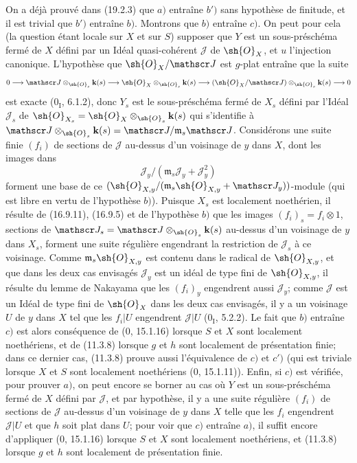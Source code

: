 On a déjà prouvé dans (19.2.3) que $a)$ entraîne $b')$ sans hypothèse de finitude, et il est trivial que $b')$ entraîne $b)$. Montrons que $b)$ entraîne $c)$. On peut pour cela (la question étant locale sur $X$ et sur $S$) supposer que $Y$ est un sous-préschéma fermé de $X$ défini par un Idéal quasi-cohérent $\mathscr J$ de $\sh{O}_X$, et $u$ l'injection canonique. L'hypothèse que $\sh{O}_X/\mathscr J$ est $g$-plat entraîne que la suite
\[
  0\longrightarrow\mathscr J\otimes_{\sh{O}_s}\mathbf k(s)\longrightarrow\sh{O}_X\otimes_{\sh{O}_s}\mathbf k(s)\longrightarrow(\sh{O}_X/\mathscr J)\otimes_{\sh{O}_s}\mathbf k(s)\longrightarrow0
\]
est exacte ($0_{\mathrm I}$, 6.1.2), donc $Y_s$ est le sous-préschéma fermé de $X_s$ défini par l'Idéal $\mathscr J_s$ de $\sh{O}_{X_s}=\sh{O}_X\otimes_{\sh{O}_s}\mathbf k(s)$ qui s'identifie à $\mathscr J\otimes_{\sh{O}_s}\mathbf k(s)=\mathscr J/\mathfrak m_s\mathscr J$. Considérons une suite finie $(f_i)$ de sections de $\mathscr J$ au-dessus d'un voisinage de $y$ dans $X$, dont les images dans
\[
  \mathscr J_y/(\mathfrak m_s\mathscr J_y+\mathscr J_y^2)
\]
forment une base de ce $(\sh{O}_{X,y}/(\mathfrak m_s\sh{O}_{X,y}+\mathscr J_y))$-module (qui est libre en vertu de l'hypothèse $b)$). Puisque $X_s$ est localement noethérien, il résulte de (16.9.11), (16.9.5) et de l'hypothèse $b)$ que les images $(f_i)_s=f_i\otimes1$, sections de $\mathscr J_s=\mathscr J\otimes_{\sh{O}_s}\mathbf k(s)$ au-dessus d'un voisinage de $y$ dans $X_s$, forment une suite régulière engendrant la restriction de $\mathscr J_s$ à ce voisinage. Comme $\mathfrak m_s\sh{O}_{X,y}$ est contenu dans le radical de $\sh{O}_{X,y}$, et que dans les deux cas envisagés $\mathscr J_y$ est un idéal de type fini de $\sh{O}_{X,y}$, il résulte du lemme de Nakayama que les $(f_i)_y$ engendrent aussi $\mathscr J_y$; comme $\mathscr J$ est un Idéal de type fini de $\sh{O}_X$ dans les deux cas envisagés, il y a un voisinage $U$ de $y$ dans $X$ tel que les $f_i|U$ engendrent $\mathscr J|U$ ($0_{\mathrm I}$, 5.2.2). Le fait que $b)$ entraîne $c)$ est alors conséquence de ($0$, 15.1.16) lorsque $S$ et $X$ sont localement noethériens, et de (11.3.8) lorsque $g$ et $h$ sont localement de présentation finie; dans ce dernier cas, (11.3.8) prouve aussi l'équivalence de $c)$ et $c')$ (qui est triviale lorsque $X$ et $S$ sont localement noethériens ($0$, 15.1.11)). Enfin, si $c)$ est vérifiée, pour prouver $a)$, on peut encore se borner au cas où $Y$ est un sous-préschéma fermé de $X$ défini par $\mathscr J$, et par hypothèse, il y a une suite régulière $(f_i)$ de sections de $\mathscr J$ au-dessus d'un voisinage de $y$ dans $X$ telle que les $f_i$ engendrent $\mathscr J|U$ et que $h$ soit plat dans $U$; pour voir que $c)$ entraîne $a)$, il suffit encore d'appliquer ($0$, 15.1.16) lorsque $S$ et $X$ sont localement noethériens, et (11.3.8) lorsque $g$ et $h$ sont localement de présentation finie.

